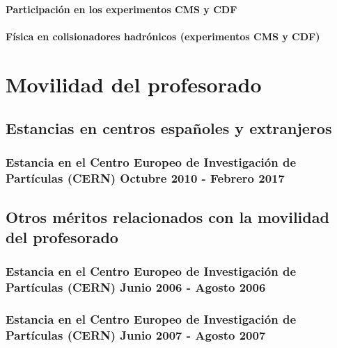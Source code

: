 \documentclass[a4paper, 11pt, twoside, openright]{report}
\begin{document}
\paragraph{Participación en los experimentos CMS y CDF}


\paragraph{Física en colisionadores hadrónicos (experimentos CMS y CDF)}




\section{Movilidad del profesorado}

\subsection{Estancias en centros españoles y extranjeros}

\subsubsection{Estancia en el Centro Europeo de Investigación de Partículas (CERN) Octubre 2010 - Febrero 2017}



\subsection{Otros méritos relacionados con la movilidad del profesorado}

\subsubsection{Estancia en el Centro Europeo de Investigación de Partículas (CERN) Junio 2006 - Agosto 2006}



\subsubsection{Estancia en el Centro Europeo de Investigación de Partículas (CERN) Junio 2007 - Agosto 2007}

\end{document}
